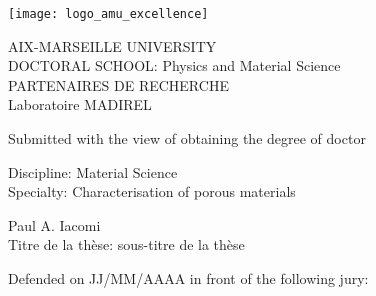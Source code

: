\begin{titlepage}

\vspace*{-2cm}
\begin{center}
	\begin{minipage}[c]{0.70\linewidth}
		\raggedright\texttt{[image: logo\_amu\_excellence]}
	\end{minipage}\hfill
\end{center}

\begin{flushleft}
	\vspace{0.2cm}
	\LARGE AIX-MARSEILLE UNIVERSITY\\
	\vspace{0.2cm}
	\Large DOCTORAL SCHOOL: Physics and Material Science\\
	\vspace{0.2cm}
	\normalsize\textcolor{black!50}{PARTENAIRES DE RECHERCHE}\\
	\vspace{0.2cm}
	Laboratoire MADIREL\\
    \begin{center}
		\vspace{1.8cm}
		Submitted with the view of obtaining the degree of doctor\\
    \end{center}
	\vspace{0.5cm}
    Discipline: Material Science\\
    Specialty: Characterisation of porous materials\\
    \begin{center}
        \vspace{0.5cm}
        \Large Paul A. Iacomi\\
        \vspace{1cm}
            \large Titre de la thèse: sous-titre de la thèse\\
    \end{center}
	\vspace{3.4cm}
    \normalsize Defended on JJ/MM/AAAA in front of the following jury:\\
\end{flushleft}

\vspace{0.4cm}


\end{titlepage}
